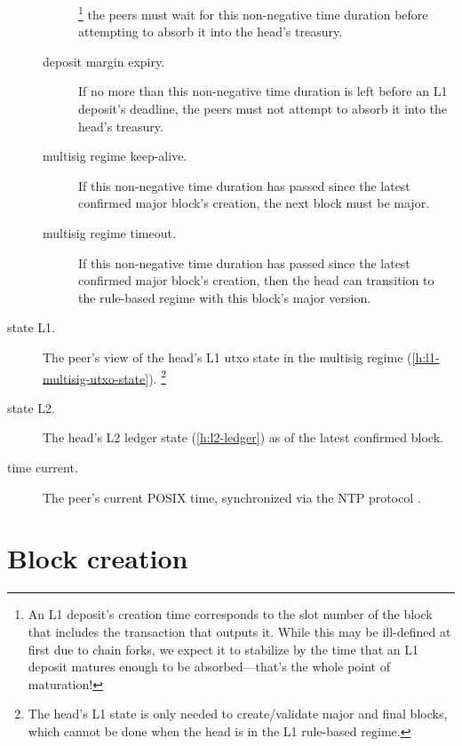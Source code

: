 \documentclass[../hydrozoa.tex]{subfiles}
\begin{document}
\begin{description}
\begin{description}
        \footnote{An L1 deposit's creation time corresponds to the slot number of the block that includes the transaction that outputs it.
          While this may be ill-defined at first due to chain forks, we expect it to stabilize by the time that an L1 deposit matures enough to be absorbed---that's the whole point of maturation!}
        the peers must wait for this non-negative time duration before attempting to absorb it into the head's treasury.
      \item[deposit margin expiry.] If no more than this non-negative time duration is left before an L1 deposit's deadline, the peers must not attempt to absorb it into the head's treasury.
      \item[multisig regime keep-alive.] If this non-negative time duration has passed since the latest confirmed major block's creation, the next block must be major.
      \item[multisig regime timeout.] If this non-negative time duration has passed since the latest confirmed major block's creation, then the head can transition to the rule-based regime with this block's major version.
    \end{description}
  \item[state L1.] The peer's view of the head's L1 utxo state in the multisig regime (\cref{h:l1-multisig-utxo-state}).%
    \footnote{The head's L1 state is only needed to create/validate major and final blocks, which cannot be done when the head is in the L1 rule-based regime.}
  \item[state L2.] The head's L2 ledger state (\cref{h:l2-ledger}) as of the latest confirmed block.
  \item[time current.] The peer's current POSIX time, synchronized via the NTP protocol \citep{MillsEtAlNetworkTimeProtocol2010}.
\end{description}

\section{Block creation}%
\label{h:l2-block-creation}%
\end{document}
